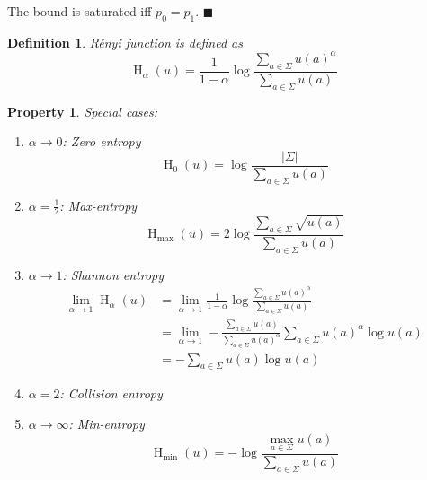 \documentclass[aps,pra,onecolumn,notitlepage,superscriptaddress]{revtex4-1}
\newcommand{\op}[1]{\operatorname{#1}}
\newtheorem{defi}{Definition}
\newtheorem{proper}{Property}
\def\qed{$\blacksquare$ \newline}
\begin{document}
    The bound is saturated iff $p_0 = p_1$.
    \qed

    \begin{defi}
        R\'{e}nyi function is defined as
        \begin{equation}
            \op H_\alpha(u) = \frac{1}{1-\alpha} \log \frac{\sum_{a \in \Sigma} u(a)^\alpha}{\sum_{a \in \Sigma} u(a)}
        \end{equation}
    \end{defi}
    
    \begin{proper}
        Special cases:
        \begin{enumerate}
            \item $\alpha \to 0$: Zero entropy
            \begin{equation}
                \op H_0(u) = \log \frac{|\Sigma|}{\sum_{a \in \Sigma} u(a)}
            \end{equation}

            \item $\alpha = \frac 1 2$:  Max-entropy
            \begin{equation}
                \op H_{\max}(u) = 2 \log \frac{\sum_{a \in \Sigma} \sqrt{u(a)}}{\sum_{a \in \Sigma} u(a)}
            \end{equation}

            \item $\alpha \to 1$: Shannon entropy
            \begin{align*}
                \lim_{\alpha \to 1} \op H_\alpha(u)
                &= \lim_{\alpha \to 1} \frac{1}{1-\alpha} \log \frac{\sum_{a \in \Sigma} u(a)^\alpha}{\sum_{a \in \Sigma} u(a)} \\
                &= \lim_{\alpha \to 1} - \frac{\sum_{a \in \Sigma} u(a)}{\sum_{a \in \Sigma} u(a)^\alpha} \sum_{a \in \Sigma} u(a)^\alpha \log u(a) \\
                &= - \sum_{a \in \Sigma} u(a) \log u(a)
            \end{align*}

            \item $\alpha = 2$: Collision entropy
            
            \item $\alpha \to \infty$: Min-entropy
            \begin{equation}
                \op H_{\min}(u) = - \log \frac{\max_{a \in \Sigma} u(a)}{\sum_{a \in \Sigma} u(a)}
            \end{equation}
        \end{enumerate}
    \end{proper}
    
\end{document}
